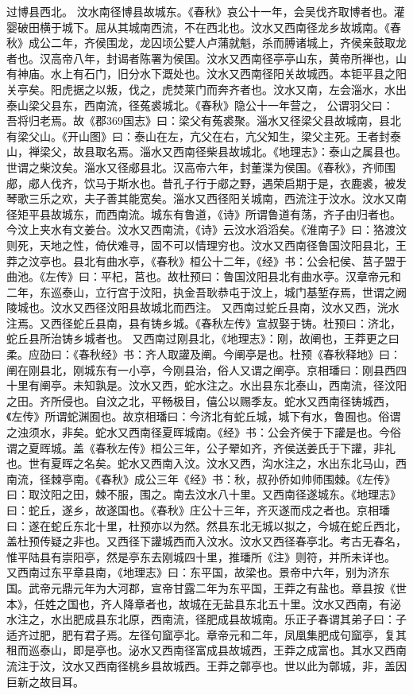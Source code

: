 \documentclass[12pt,UTF8]{ctexbook}
\begin{document}
过博县西北。
汶水南径博县故城东。《春秋》哀公十一年，会吴伐齐取博者也。灌婴破田横于城下。屈从其城南西流，不在西北也。汶水又西南径龙乡故城南。《春秋》成公二年，齐侯围龙，龙囚顷公嬖人卢蒲就魁，杀而膊诸城上，齐侯亲鼓取龙者也。汉高帝八年，封谒者陈署为侯国。汶水又西南径亭亭山东，黄帝所禅也，山有神庙。水上有石门，旧分水下溉处也。汶水又西南径阳关故城西。本钜平县之阳关亭矣。阳虎据之以叛，伐之，虎焚莱门而奔齐者也。汶水又南，左会淄水，水出泰山梁父县东，西南流，径菟裘城北。《春秋》隐公十一年营之， 公谓羽父曰： 吾将归老焉。故《郡369国志》曰：梁父有菟裘聚。淄水又径梁父县故城南，县北有梁父山。《开山图》曰：泰山在左，亢父在右，亢父知生，梁父主死。王者封泰山，禅梁父，故县取名焉。淄水又西南径柴县故城北。《地理志》：泰山之属县也。世谓之柴汶矣。淄水又径郕县北。汉高帝六年，封董渫为侯国。《春秋》，齐师围郕，郕人伐齐，饮马于斯水也。昔孔子行于郕之野，遇荣启期于是，衣鹿裘，被发琴歌三乐之欢，夫子善其能宽矣。淄水又西径阳关城南，西流注于汶水。汶水又南径矩平县故城东，而西南流。城东有鲁道，《诗》所谓鲁道有荡，齐子由归者也。今汶上夹水有文姜台。汶水又西南流，《诗》云汶水滔滔矣。《淮南子》曰：狢渡汶则死，天地之性，倚伏难寻，固不可以情理穷也。汶水又西南径鲁国汶阳县北，王莽之汶亭也。县北有曲水亭，《春秋》桓公十二年，《经》书：公会杞侯、莒子盟于曲池。《左传》曰：平杞，莒也。故杜预曰：鲁国汶阳县北有曲水亭。汉章帝元和二年，东巡泰山，立行宫于汶阳，执金吾耿恭屯于汶上，城门基堑存焉，世谓之阙陵城也。汶水又西径汶阳县故城北而西注。
又西南过蛇丘县南，汶水又西，洸水注焉。又西径蛇丘县南，县有铸乡城。《春秋左传》宣叔娶于铸。杜预曰：济北，蛇丘县所治铸乡城者也。
又西南过刚县北，《地理志》：刚，故阐也，王莽更之曰柔。应劭曰：《春秋经》书：齐人取讙及阐。今阐亭是也。杜预《春秋释地》曰：阐在刚县北，刚城东有一小亭，今刚县治，俗人又谓之阐亭。京相璠曰：刚县西四十里有阐亭。未知孰是。汶水又西，蛇水注之。水出县东北泰山，西南流，径汶阳之田。齐所侵也。自汶之北，平畅极目，僖公以赐季友。蛇水又西南径铸城西，《左传》所谓蛇渊囿也。故京相璠曰：今济北有蛇丘城，城下有水，鲁囿也。俗谓之浊须水，非矣。蛇水又西南径夏晖城南。《经》书：公会齐侯于下讙是也。今俗谓之夏晖城。盖《春秋左传》桓公三年，公子翚如齐，齐侯送姜氏于下讙，非礼也。世有夏晖之名矣。蛇水又西南入汶。汶水又西，沟水注之，水出东北马山，西南流，径棘亭南。《春秋》成公三年《经》书：秋，叔孙侨如帅师围棘。《左传》曰：取汶阳之田，棘不服，围之。南去汶水八十里。又西南径遂城东。《地理志》曰：蛇丘，遂乡，故遂国也。《春秋》庄公十三年，齐灭遂而戍之者也。京相璠曰：遂在蛇丘东北十里，杜预亦以为然。然县东北无城以拟之，今城在蛇丘西北，盖杜预传疑之非也。又西径下讙城西而入汶水。汶水又西径春亭北。考古无春名，惟平陆县有崇阳亭，然是亭东去刚城四十里，推璠所《注》则符，并所未详也。
又西南过东平章县南，《地理志》曰：东平国，故梁也。景帝中六年，别为济东国。武帝元鼎元年为大河郡，宣帝甘露二年为东平国，王莽之有盐也。章县按《世本》，任姓之国也，齐人降章者也，故城在无盐县东北五十里。汶水又西南，有泌水注之，水出肥成县东北原，西南流，径肥成县故城南。乐正子春谓其弟子曰：子适齐过肥，肥有君子焉。左径句窳亭北。章帝元和二年，凤凰集肥成句窳亭，复其租而巡泰山，即是亭也。泌水又西南径富成县故城西，王莽之成富也。其水又西南流注于汶，汶水又西南径桃乡县故城西。王莽之鄣亭也。世以此为鄣城，非，盖因巨新之故目耳。
\end{document}
